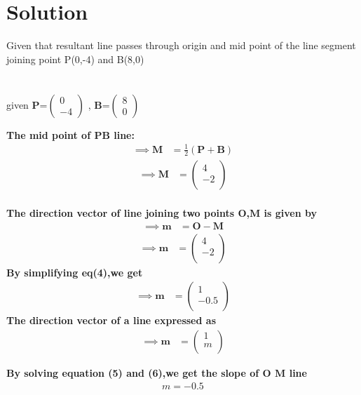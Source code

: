 \documentclass[journal,12pt,twocolumn]{IEEEtran}
\newcommand{\myvec}[1]{\ensuremath{\begin{pmatrix}#1\end{pmatrix}}}
\let\vec\mathbf
\begin{document}
\section{Solution}
Given that resultant line passes through origin and mid point of the line segment joining point P(0,-4) and B(8,0) \\
\\
\\
given ${\vec{P}}$=$\myvec{
  0\\
  -4}$
 , ${\vec{B}}$=$\myvec{
  8\\
  0}$
  
  
\textbf{The mid point of PB line:} \\
\begin{align}
\implies\vec{M} &=\frac{1}{2}(\vec{P}+\vec{B})
\end{align}
\begin{align}
\implies\vec{M} &= \begin{pmatrix}4 \\ -2 \\ \end{pmatrix} 
\end{align}
\\
\textbf{The direction vector of line joining two points $\vec{O}$,$\vec{M}$ is given by}
\begin{align}
\implies\vec{m}&=\vec{O}-\vec{M}
\end{align}
\begin{align}
\implies\vec{m} &= \begin{pmatrix}4 \\ -2 \\ \end{pmatrix}
\end{align}
\textbf{By simplifying eq(4),we get}
\begin{align}
\implies\vec{m} &= \begin{pmatrix}1 \\ -0.5 \\ \end{pmatrix}
\end{align}
\textbf{The direction vector of a line expressed as}
\begin{align}
\implies\vec{m} &= \begin{pmatrix}1 \\ m \\ \end{pmatrix}
\end{align}

\textbf{By solving equation (5) and (6),we get the slope of $\vec{O}$ $\vec{M}$ line}
\begin{align}
        \boxed{m=-0.5}
 \end{align}
\end{document}
